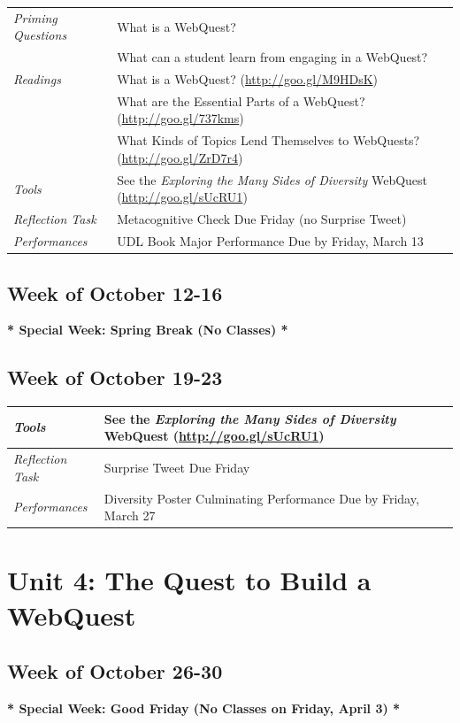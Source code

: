 \documentclass{tufte-handout}
\newcommand{\tabpq}{\faQuestionSign\medspace\textit{Priming Questions}}
\newcommand{\tabread}{\faBook\medspace\textit{Readings}}
\newcommand{\tabtools}{\faWrench\medspace\textit{Tools}}
\newcommand{\tabtweet}{\faLightbulb\medspace\textit{Reflection Task} & Surprise Tweet Due Friday \\}
\newcommand{\tabcheck}{\faLightbulb\medspace\textit{Reflection Task} & Metacognitive Check Due Friday (no Surprise Tweet) \\}
\newcommand{\tabperformance}{\faTasks\medspace\textit{Performances}}
\newenvironment{tabsched}
	{\small
	\begin{tabular}{p{1.5in}p{5in}}
	\toprule}
	{\bottomrule
	\end{tabular}
	\normalsize}
\newcommand{\weeknine}{October 12-16}
\newcommand{\weekten}{October 19-23}
\newcommand{\weekeleven}{October 26-30}
\begin{document}
\begin{tabsched}
	\tabpq & What is a WebQuest? \\
	& What can a student learn from engaging in a WebQuest? \\
	\midrule
	\tabread &  What is a WebQuest? (\url{http://goo.gl/M9HDsK}) \\
	& What are the Essential Parts of a WebQuest? (\url{http://goo.gl/737kms}) \\
	& What Kinds of Topics Lend Themselves to WebQuests? (\url{http://goo.gl/ZrD7r4}) \\
	\midrule
	\tabtools & See the \textit{Exploring the Many Sides of Diversity} WebQuest (\url{http://goo.gl/sUcRU1}) \\
	\midrule
	\tabcheck
	\midrule
	\tabperformance & UDL Book Major Performance Due by Friday, March 13 \\
\end{tabsched}

\subsection{Week of \weeknine}

\begin{center}
	\textbf{* Special Week: Spring Break (No Classes) *}
\end{center}

\subsection{Week of \weekten}

\begin{tabsched}
	\tabtools & See the \textit{Exploring the Many Sides of Diversity} WebQuest (\url{http://goo.gl/sUcRU1}) \\
	\midrule
	\tabtweet
	\midrule
	\tabperformance & Diversity Poster Culminating Performance Due by Friday, March 27 \\
\end{tabsched}

\section{Unit 4: The Quest to Build a WebQuest}

\subsection{Week of \weekeleven}

\begin{center}
	\textbf{* Special Week: Good Friday (No Classes on Friday, April 3) *}
\end{center}
\end{document}
